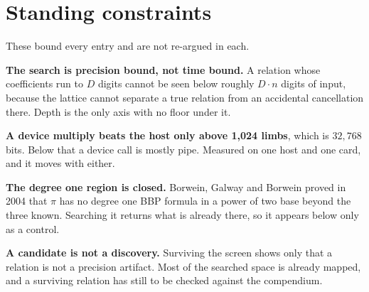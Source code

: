 \section{Standing constraints}

These bound every entry and are not re-argued in each.

\textbf{The search is precision bound, not time bound.} A relation whose coefficients run to \(D\) digits cannot be seen below roughly \(D \cdot n\) digits of input, because the lattice cannot separate a true relation from an accidental cancellation there. Depth is the only axis with no floor under it.

\textbf{A device multiply beats the host only above 1,024 limbs}, which is \(32{,}768\) bits. Below that a device call is mostly pipe. Measured on one host and one card, and it moves with either.

\textbf{The degree one region is closed.} Borwein, Galway and Borwein proved in 2004 that \(\pi\) has no degree one BBP formula in a power of two base beyond the three known. Searching it returns what is already there, so it appears below only as a control.

\textbf{A candidate is not a discovery.} Surviving the screen shows only that a relation is not a precision artifact. Most of the searched space is already mapped, and a surviving relation has still to be checked against the compendium.
